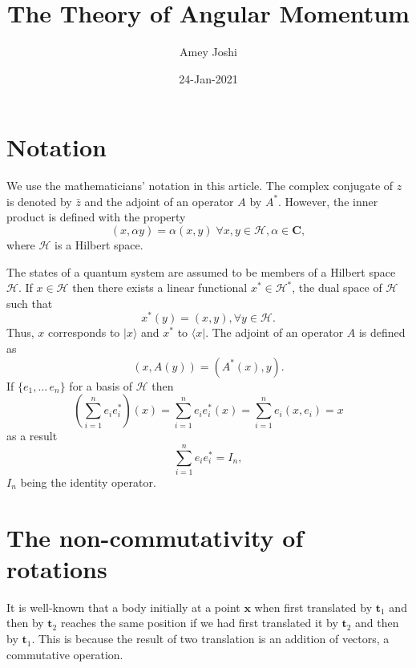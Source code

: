 \documentclass{article}
\title{The Theory of Angular Momentum}
\author{Amey Joshi}
\date{24-Jan-2021}
\numberwithin{equation}{section}
\let\vec\bm
\begin{document}
\maketitle
{}
\section{Notation}\label{s1}
We use the mathematicians' notation in this article. The complex conjugate of
$z$ is denoted by $\bar{z}$ and the adjoint of an operator $A$ by $A^\ast$.
However, the inner product is defined with the property
\begin{equation}\label{s1e1}
(x,\alpha y)=\alpha(x, y)\;\forall x, y \in \mathcal{H}, \alpha \in \mathbf{C},
\end{equation}
where $\mathcal{H}$ is a Hilbert space.

The states of a quantum system are assumed to be members of a Hilbert space
$\mathcal{H}$. If $x \in \mathcal{H}$ then there exists a linear functional
$x^\ast \in \mathcal{H}^\ast$, the dual space of $\mathcal{H}$ such that
\begin{equation}\label{s1e2}
x^\ast(y) = (x, y), \forall y \in \mathcal{H}.
\end{equation}
Thus, $x$ corresponds to $|x\rangle$ and $x^\ast$ to $\langle x|$. The adjoint
of an operator $A$ is defined as
\begin{equation}\label{s1e3}
(x, A(y)) = (A^\ast(x), y).
\end{equation}
If $\{e_1, \ldots\, e_n\}$ for a basis of $\mathcal{H}$ then
\begin{equation}\label{s1e4}
\left(\sum_{i=1}^n e_i e_i^\ast\right)(x) = \sum_{i=1}^n e_i e_i^\ast(x) = 
\sum_{i=1}^n e_i (x, e_i) = x
\end{equation}
as a result
\begin{equation}\label{s1e5}
\sum_{i=1}^n e_i e_i^\ast = I_n,
\end{equation}
$I_n$ being the identity operator.

\section{The non-commutativity of rotations}\label{s2}
It is well-known that a body initially at a point $\vec{x}$ when first 
translated by $\vec{t}_1$ and then by $\vec{t}_2$ reaches the same position if 
we had first translated it by $\vec{t}_2$ and then by $\vec{t}_1$. This is 
because the result of two translation is an addition of vectors, a commutative 
operation.
\end{document}
